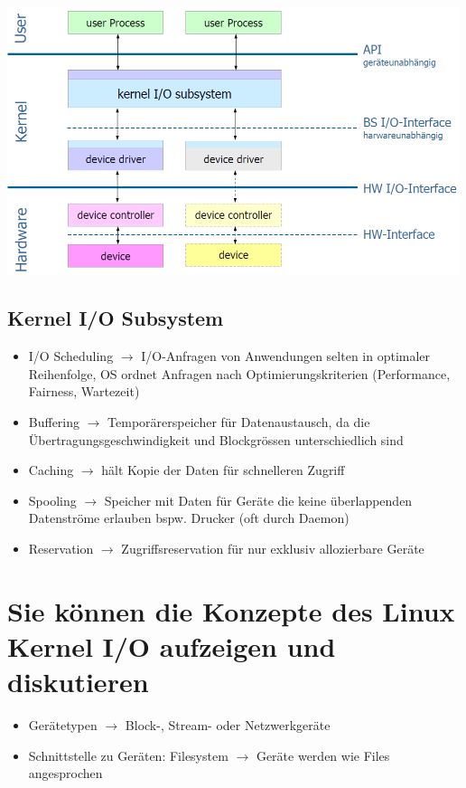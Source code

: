\documentclass{report}
\newenvironment{Figure}
	{\par\medskip\noindent\minipage{\linewidth}}
	{\endminipage\par\medskip}
\theoremstyle{definition}
\theoremstyle{example}
\begin{document}
\begin{Figure}
\centering
\includegraphics[width=500px]{img/IOArchitektur.png}
	\label{fig:Abbildung der IO Architektur}
\end{Figure}

	\subsection{Kernel I/O Subsystem}
\begin{itemize}
	\item I/O Scheduling $\rightarrow$ I/O-Anfragen von Anwendungen selten in optimaler Reihenfolge, OS ordnet Anfragen nach Optimierungskriterien (Performance, Fairness, Wartezeit)
	\item Buffering $\rightarrow$ Temporärerspeicher für Datenaustausch, da die Übertragungsgeschwindigkeit und Blockgrössen unterschiedlich sind
	\item Caching $\rightarrow$ hält Kopie der Daten für schnelleren Zugriff
	\item Spooling $\rightarrow$ Speicher mit Daten für Geräte die keine überlappenden Datenströme erlauben bspw. Drucker (oft durch Daemon)
	\item Reservation $\rightarrow$ Zugriffsreservation für nur exklusiv allozierbare Geräte
\end{itemize}


\section{Sie können die Konzepte des Linux Kernel I/O aufzeigen und diskutieren}

\begin{itemize}
	\item Gerätetypen $\rightarrow$ Block-, Stream- oder Netzwerkgeräte
	\item Schnittstelle zu Geräten: Filesystem $\rightarrow$ Geräte werden wie Files angesprochen
\end{itemize}
\end{document}
